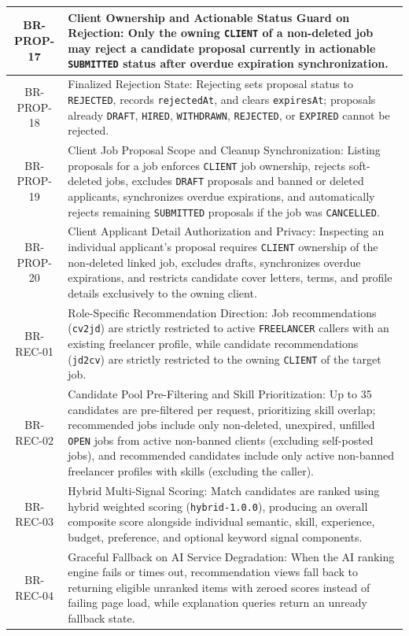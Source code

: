\begin{longtable}{|c|p{12cm}|}
    BR-PROP-17 & Client Ownership and Actionable Status Guard on Rejection: Only the owning \texttt{CLIENT} of a non-deleted job may reject a candidate proposal currently in actionable \texttt{SUBMITTED} status after overdue expiration synchronization. \\ \hline
    BR-PROP-18 & Finalized Rejection State: Rejecting sets proposal status to \texttt{REJECTED}, records \texttt{rejectedAt}, and clears \texttt{expiresAt}; proposals already \texttt{DRAFT}, \texttt{HIRED}, \texttt{WITHDRAWN}, \texttt{REJECTED}, or \texttt{EXPIRED} cannot be rejected. \\ \hline
    BR-PROP-19 & Client Job Proposal Scope and Cleanup Synchronization: Listing proposals for a job enforces \texttt{CLIENT} job ownership, rejects soft-deleted jobs, excludes \texttt{DRAFT} proposals and banned or deleted applicants, synchronizes overdue expirations, and automatically rejects remaining \texttt{SUBMITTED} proposals if the job was \texttt{CANCELLED}. \\ \hline
    BR-PROP-20 & Client Applicant Detail Authorization and Privacy: Inspecting an individual applicant's proposal requires \texttt{CLIENT} ownership of the non-deleted linked job, excludes drafts, synchronizes overdue expirations, and restricts candidate cover letters, terms, and profile details exclusively to the owning client. \\ \hline
    BR-REC-01 & Role-Specific Recommendation Direction: Job recommendations (\texttt{cv2jd}) are strictly restricted to active \texttt{FREELANCER} callers with an existing freelancer profile, while candidate recommendations (\texttt{jd2cv}) are strictly restricted to the owning \texttt{CLIENT} of the target job. \\ \hline
    BR-REC-02 & Candidate Pool Pre-Filtering and Skill Prioritization: Up to 35 candidates are pre-filtered per request, prioritizing skill overlap; recommended jobs include only non-deleted, unexpired, unfilled \texttt{OPEN} jobs from active non-banned clients (excluding self-posted jobs), and recommended candidates include only active non-banned freelancer profiles with skills (excluding the caller). \\ \hline
    BR-REC-03 & Hybrid Multi-Signal Scoring: Match candidates are ranked using hybrid weighted scoring (\texttt{hybrid-1.0.0}), producing an overall composite score alongside individual semantic, skill, experience, budget, preference, and optional keyword signal components. \\ \hline
    BR-REC-04 & Graceful Fallback on AI Service Degradation: When the AI ranking engine fails or times out, recommendation views fall back to returning eligible unranked items with zeroed scores instead of failing page load, while explanation queries return an unready fallback state. \\ \hline

\end{longtable}
